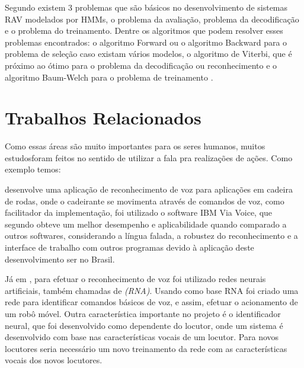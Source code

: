 Segundo  existem 3 problemas que são básicos no desenvolvimento de sistemas RAV modelados por HMMs, o problema da avaliação, problema da decodificação e o problema do treinamento. Dentre os algoritmos que podem resolver esses problemas encontrados: o algoritmo Forward ou o algoritmo Backward para o problema de seleção caso existam vários modelos, o algoritmo de Viterbi, que é próximo ao ótimo para o problema da decodificação ou reconhecimento e o algoritmo Baum-Welch para o problema de treinamento \cite{RavIsolAnderson}.




\section{Trabalhos Relacionados}

Como essas áreas são muito importantes para os seres humanos, muitos estudosforam feitos no sentido de utilizar a fala pra realizações de ações. Como exemplo temos:

 desenvolve uma aplicação de reconhecimento de voz para aplicações em cadeira de rodas, onde o cadeirante se movimenta através de comandos de voz, como facilitador da implementação, foi utilizado o software IBM Via Voice, que segundo  obteve um melhor desempenho e aplicabilidade quando comparado a outros softwares, considerando a língua falada, a robustez do reconhecimento e a interface de trabalho com outros programas devido à aplicação deste desenvolvimento ser no Brasil.

Já em , para efetuar o reconhecimento de voz foi utilizado redes neurais artificiais, também chamadas de \textit{(RNA)}. Usando como base RNA foi criado uma rede para identificar comandos básicos de voz, e assim, efetuar o acionamento de um robô móvel. Outra característica importante no projeto é o identificador neural, que foi desenvolvido como dependente do locutor, onde um sistema é desenvolvido com base nas características vocais de um locutor. Para novos locutores seria necessário um novo treinamento da rede com as características vocais dos novos locutores.





